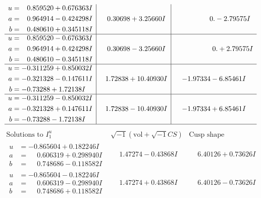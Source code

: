 \documentclass[1p]{elsarticle_modified}
\theoremstyle{definition}
\newcommand{\I}{\sqrt{-1}}
\begin{document}
$$\begin{array}{c|c|c}
\begin{aligned}
u &= \phantom{-}0.859520 + 0.676363 I \\
a &= \phantom{-}0.964914 - 0.424298 I \\
b &= \phantom{-}0.480610 + 0.345118 I\end{aligned}
 & \phantom{-}0.30698 + 3.25660 I & \phantom{-0.000000 } 0. - 2.79575 I \\ \hline\begin{aligned}
u &= \phantom{-}0.859520 - 0.676363 I \\
a &= \phantom{-}0.964914 + 0.424298 I \\
b &= \phantom{-}0.480610 - 0.345118 I\end{aligned}
 & \phantom{-}0.30698 - 3.25660 I & \phantom{-0.000000 -}0. + 2.79575 I \\ \hline\begin{aligned}
u &= -0.311259 + 0.850032 I \\
a &= -0.321328 - 0.147611 I \\
b &= -0.73288 + 1.72138 I\end{aligned}
 & \phantom{-}1.72838 + 10.40930 I & -1.97334 - 6.85461 I \\ \hline\begin{aligned}
u &= -0.311259 - 0.850032 I \\
a &= -0.321328 + 0.147611 I \\
b &= -0.73288 - 1.72138 I\end{aligned}
 & \phantom{-}1.72838 - 10.40930 I & -1.97334 + 6.85461 I\\
 \hline 
 \end{array}$$\newpage$$\begin{array}{c|c|c}  
\text{Solutions to }I^u_{1}& \I (\text{vol} + \sqrt{-1}CS) & \text{Cusp shape}\\
 \hline 
\begin{aligned}
u &= -0.865604 + 0.182246 I \\
a &= \phantom{-}0.606319 + 0.298940 I \\
b &= \phantom{-}0.748686 - 0.118582 I\end{aligned}
 & \phantom{-}1.47274 - 0.43868 I & \phantom{-}6.40126 + 0.73626 I \\ \hline\begin{aligned}
u &= -0.865604 - 0.182246 I \\
a &= \phantom{-}0.606319 - 0.298940 I \\
b &= \phantom{-}0.748686 + 0.118582 I\end{aligned}
 & \phantom{-}1.47274 + 0.43868 I & \phantom{-}6.40126 - 0.73626 I \\ \hline\begin{aligned}

\end{aligned}
\end{array}$$
\end{document}
